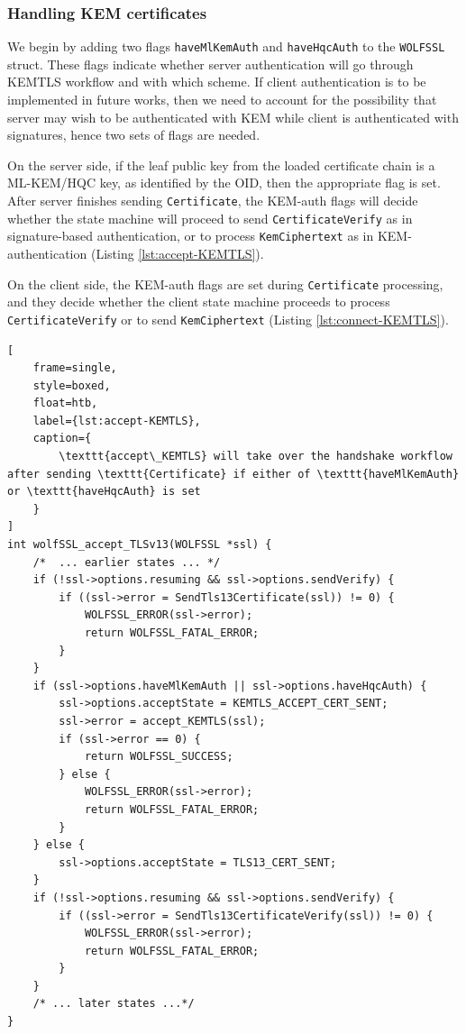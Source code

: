 \documentclass[letterpaper,12pt,titlepage,oneside,final]{book}
\begin{document}
\subsubsection{Handling KEM certificates}
We begin by adding two flags \texttt{haveMlKemAuth} and \texttt{haveHqcAuth} to the \texttt{WOLFSSL} struct.
These flags indicate whether server authentication will go through KEMTLS workflow and with which scheme.
If client authentication is to be implemented in future works, then we need to account for the possibility that server may wish to be authenticated with KEM while client is authenticated with signatures, hence two sets of flags are needed.

On the server side, if the leaf public key from the loaded certificate chain is a ML-KEM/HQC key, as identified by the OID, then the appropriate flag is set.
After server finishes sending \texttt{Certificate}, the KEM-auth flags will decide whether the state machine will proceed to send \texttt{CertificateVerify} as in signature-based authentication, or to process \texttt{KemCiphertext} as in KEM-authentication (Listing \ref{lst:accept-KEMTLS}).

On the client side, the KEM-auth flags are set during \texttt{Certificate} processing, and they decide whether the client state machine proceeds to process \texttt{CertificateVerify} or to send \texttt{KemCiphertext} (Listing \ref{lst:connect-KEMTLS}).

\begin{lstlisting}[
    frame=single, 
    style=boxed, 
    float=htb,
    label={lst:accept-KEMTLS}, 
    caption={
        \texttt{accept\_KEMTLS} will take over the handshake workflow after sending \texttt{Certificate} if either of \texttt{haveMlKemAuth} or \texttt{haveHqcAuth} is set
    }
]
int wolfSSL_accept_TLSv13(WOLFSSL *ssl) {
    /*  ... earlier states ... */
    if (!ssl->options.resuming && ssl->options.sendVerify) {
        if ((ssl->error = SendTls13Certificate(ssl)) != 0) {
            WOLFSSL_ERROR(ssl->error);
            return WOLFSSL_FATAL_ERROR;
        }
    }
    if (ssl->options.haveMlKemAuth || ssl->options.haveHqcAuth) {
        ssl->options.acceptState = KEMTLS_ACCEPT_CERT_SENT;
        ssl->error = accept_KEMTLS(ssl);
        if (ssl->error == 0) {
            return WOLFSSL_SUCCESS;
        } else {
            WOLFSSL_ERROR(ssl->error);
            return WOLFSSL_FATAL_ERROR;
        }
    } else {
        ssl->options.acceptState = TLS13_CERT_SENT;
    }
    if (!ssl->options.resuming && ssl->options.sendVerify) {
        if ((ssl->error = SendTls13CertificateVerify(ssl)) != 0) {
            WOLFSSL_ERROR(ssl->error);
            return WOLFSSL_FATAL_ERROR;
        }
    }
    /* ... later states ...*/
}
\end{lstlisting}
\end{document}
